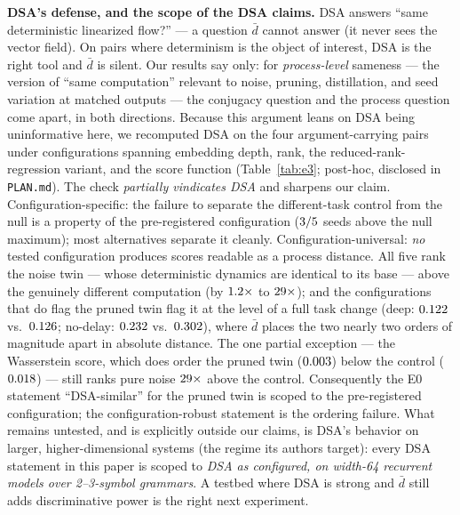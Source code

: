 \documentclass[11pt]{article}
\newcommand{\dbar}{\bar d}
\begin{document}
\textbf{DSA's defense, and the scope of the DSA claims.} DSA answers ``same
deterministic linearized flow?'' --- a question $\dbar$ cannot answer (it never sees
the vector field). On pairs where determinism is the object of interest, DSA is the
right tool and $\dbar$ is silent. Our results say only: for \emph{process-level}
sameness --- the version of ``same computation'' relevant to noise, pruning,
distillation, and seed variation at matched outputs --- the conjugacy question and
the process question come apart, in both directions. Because this argument leans on
DSA being uninformative here, we recomputed DSA on the four argument-carrying pairs
under \eThreeNConfigs{} configurations spanning embedding depth, rank, the
reduced-rank-regression variant, and the score function (Table~\ref{tab:e3};
post-hoc, disclosed in \texttt{PLAN.md}). The check \emph{partially vindicates DSA}
and sharpens our claim. Configuration-specific: the failure to separate the
different-task control from the null is a property of the pre-registered
configuration ($3/5$ seeds above the null maximum); most
alternatives separate it cleanly. Configuration-universal: \emph{no} tested
configuration produces scores readable as a process distance. All five rank the
noise twin --- whose deterministic dynamics are identical to its base --- above the
genuinely different computation (by $1.2\times$ to
$29\times$); and the configurations that do flag the pruned
twin flag it at the level of a full task change (deep: $0.122$ vs.\
$0.126$; no-delay: $0.232$ vs.\ $0.302$), where
$\dbar$ places the two nearly two orders of magnitude apart in absolute distance.
The one partial exception --- the Wasserstein score, which does order the pruned
twin ($0.003$) below the control ($0.018$) --- still ranks pure
noise $29\times$ above the control. Consequently the E0
statement ``DSA-similar'' for the pruned twin is scoped to the pre-registered
configuration; the configuration-robust statement is the ordering failure. What
remains untested, and is explicitly outside our claims, is DSA's behavior on larger,
higher-dimensional systems (the regime its authors target): every DSA statement in
this paper is scoped to \emph{DSA as configured, on width-64 recurrent models over
2--3-symbol grammars}. A testbed where DSA is strong and $\dbar$ still adds
discriminative power is the right next experiment.
\end{document}
